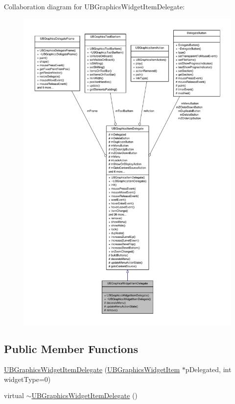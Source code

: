 Collaboration diagram for U\-B\-Graphics\-Widget\-Item\-Delegate\-:
\nopagebreak
\begin{figure}[H]
\begin{center}
\leavevmode
\includegraphics[width=350pt]{d3/d74/class_u_b_graphics_widget_item_delegate__coll__graph}
\end{center}
\end{figure}
\subsection*{Public Member Functions}
\begin{DoxyCompactItemize}
\item 
\hyperlink{class_u_b_graphics_widget_item_delegate_a3ded96262960ba8e63ab585856afb04b}{U\-B\-Graphics\-Widget\-Item\-Delegate} (\hyperlink{class_u_b_graphics_widget_item}{U\-B\-Graphics\-Widget\-Item} $\ast$p\-Delegated, int widget\-Type=0)
\item 
virtual \hyperlink{class_u_b_graphics_widget_item_delegate_abd19f56aace95ea47a058aed8d3b54ab}{$\sim$\-U\-B\-Graphics\-Widget\-Item\-Delegate} ()
\end{DoxyCompactItemize}
